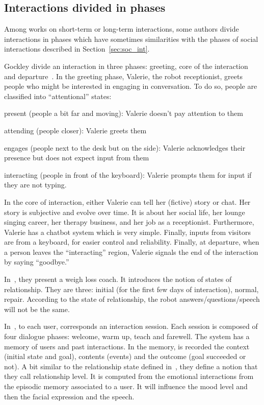 \documentclass[a4paper,11pt,twoside]{StyleThese}
\begin{document}
\subsection{Interactions divided in phases}
Among works on short-term or long-term interactions, some authors divide interactions in phases which have sometimes similarities with the phases of social interactions described in Section~\ref{sec:soc_int}.

Gockley \etal divide an interaction in three phases: greeting, core of the interaction and departure~\cite{gockley_2005_designing}. In the greeting phase, Valerie, the robot receptionist, greets people who might be interested in engaging in conversation. To do so, people are classified into ``attentional'' states:
\begin{enumerate*}
	\item present (people a bit far and moving): Valerie doesn’t pay attention to them
	\item attending (people closer): Valerie greets them
	\item engages (people next to the desk but on the side): Valerie acknowledges their presence but does not expect input from them
	\item interacting (people in front of the keyboard): Valerie prompts them for input if they are not typing.
\end{enumerate*}
In the core of interaction, either Valerie can tell her (fictive) story or chat. Her story is subjective and evolve over time. It is about her social life, her lounge singing career, her therapy business, and her job as a receptionist. Furthermore, Valerie has a chatbot system which is very simple. Finally, inputs from visitors are from a keyboard, for easier control and reliability. Finally, at departure, when a person leaves the ``interacting'' region, Valerie signals the end of the interaction by saying ``goodbye.'' 

In~\cite{kidd_2008_robots}, they present a weigh loss coach. It introduces the notion of states of relationship. They are three: initial (for the first few days of interaction), normal, repair. According to the state of relationship, the robot answers/questions/speech will not be the same.

In~\cite{kasap_2012_building}, to each user, corresponds an interaction session. Each session is composed of four dialogue phases: welcome, warm up, teach and farewell. The system has a memory of users and past interactions. In the memory, is recorded the context (initial state and goal), contents (events) and the outcome (goal succeeded or not).  A bit similar to the relationship state defined in~\cite{kidd_2008_robots}, they define a notion that they call relationship level. It is computed from the emotional interactions from the episodic memory associated to a user. It will influence the mood level and then the facial expression and the speech.
\end{document}
